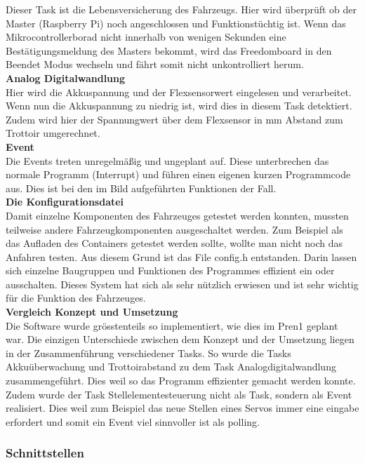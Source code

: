 Dieser Task ist die Lebensversicherung des Fahrzeugs. Hier wird überprüft ob der Master (Raspberry Pi) noch angeschlossen und Funktionstüchtig ist. Wenn das Mikrocontrollerborad nicht innerhalb von wenigen Sekunden eine Bestätigungsmeldung des Masters bekommt, wird das Freedomboard in den Beendet Modus wechseln und fährt somit nicht unkontrolliert herum. \\[0.2cm]
\textbf{Analog Digitalwandlung}\\[0.2cm]
Hier wird die Akkuspannung und der Flexsensorwert eingelesen und verarbeitet. Wenn nun die Akkuspannung zu niedrig ist, wird dies in diesem Task detektiert. Zudem wird hier der Spannungwert über dem Flexsensor in mm Abstand zum Trottoir umgerechnet.\\[0.2cm]
\textbf{Event}\\[0.2cm]
Die Events treten unregelmäßig und ungeplant auf. Diese unterbrechen das normale Programm (Interrupt) und führen einen eigenen kurzen Programmcode aus. Dies ist bei den im Bild aufgeführten Funktionen der Fall.\\[0.2cm]
\textbf{Die Konfigurationsdatei}\\[0.2cm]
Damit einzelne Komponenten des Fahrzeuges getestet werden konnten, mussten teilweise andere Fahrzeugkomponenten ausgeschaltet werden. Zum Beispiel als das Aufladen des Containers getestet werden sollte, wollte man nicht noch das Anfahren testen. Aus diesem Grund ist das File config.h entstanden. Darin lassen sich einzelne Baugruppen und Funktionen des Programmes effizient ein oder ausschalten. Dieses System hat sich als sehr nützlich erwiesen und ist sehr wichtig für die Funktion des Fahrzeuges.\\[0.2cm]
\textbf{Vergleich Konzept und Umsetzung}\\[0.2cm]
Die Software wurde grösstenteils so implementiert, wie dies im Pren1 geplant war. Die einzigen Unterschiede zwischen dem Konzept und der Umsetzung liegen in der Zusammenführung verschiedener Tasks. So wurde die Tasks Akkuüberwachung und Trottoirabstand zu dem Task Analogdigitalwandlung zusammengeführt. Dies weil so das Programm effizienter gemacht werden konnte. Zudem wurde der Task Stellelementesteuerung nicht als Task, sondern als Event realisiert. Dies weil zum Beispiel das neue Stellen eines Servos immer eine eingabe erfordert und somit ein Event viel sinnvoller ist als polling. 
\subsubsection{Schnittstellen}